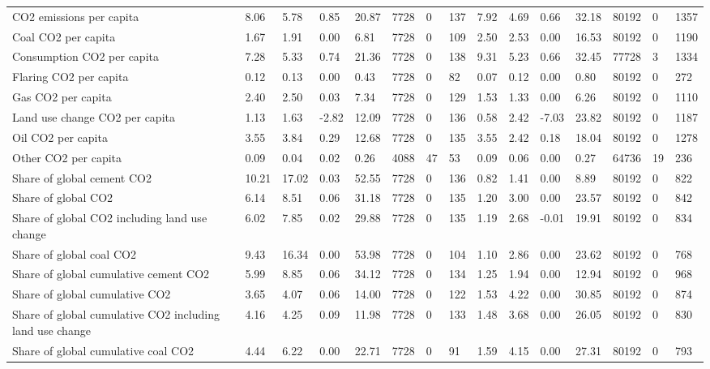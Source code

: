 \begin{longtable}{lllllllllllllll}
CO2 emissions per capita & 8.06 & 5.78 & 0.85 & 20.87 & 7728 & 0 & 137 & 7.92 & 4.69 & 0.66 & 32.18 & 80192 & 0 & 1357\\
Coal CO2 per capita & 1.67 & 1.91 & 0.00 & 6.81 & 7728 & 0 & 109 & 2.50 & 2.53 & 0.00 & 16.53 & 80192 & 0 & 1190\\
Consumption CO2 per capita & 7.28 & 5.33 & 0.74 & 21.36 & 7728 & 0 & 138 & 9.31 & 5.23 & 0.66 & 32.45 & 77728 & 3 & 1334\\
\addlinespace
Flaring CO2 per capita & 0.12 & 0.13 & 0.00 & 0.43 & 7728 & 0 & 82 & 0.07 & 0.12 & 0.00 & 0.80 & 80192 & 0 & 272\\
Gas CO2 per capita & 2.40 & 2.50 & 0.03 & 7.34 & 7728 & 0 & 129 & 1.53 & 1.33 & 0.00 & 6.26 & 80192 & 0 & 1110\\
Land use change CO2 per capita & 1.13 & 1.63 & -2.82 & 12.09 & 7728 & 0 & 136 & 0.58 & 2.42 & -7.03 & 23.82 & 80192 & 0 & 1187\\
Oil CO2 per capita & 3.55 & 3.84 & 0.29 & 12.68 & 7728 & 0 & 135 & 3.55 & 2.42 & 0.18 & 18.04 & 80192 & 0 & 1278\\
Other CO2 per capita & 0.09 & 0.04 & 0.02 & 0.26 & 4088 & 47 & 53 & 0.09 & 0.06 & 0.00 & 0.27 & 64736 & 19 & 236\\
\addlinespace
Share of global cement CO2 & 10.21 & 17.02 & 0.03 & 52.55 & 7728 & 0 & 136 & 0.82 & 1.41 & 0.00 & 8.89 & 80192 & 0 & 822\\
Share of global CO2 & 6.14 & 8.51 & 0.06 & 31.18 & 7728 & 0 & 135 & 1.20 & 3.00 & 0.00 & 23.57 & 80192 & 0 & 842\\
Share of global CO2 including land use change & 6.02 & 7.85 & 0.02 & 29.88 & 7728 & 0 & 135 & 1.19 & 2.68 & -0.01 & 19.91 & 80192 & 0 & 834\\
Share of global coal CO2 & 9.43 & 16.34 & 0.00 & 53.98 & 7728 & 0 & 104 & 1.10 & 2.86 & 0.00 & 23.62 & 80192 & 0 & 768\\
Share of global cumulative cement CO2 & 5.99 & 8.85 & 0.06 & 34.12 & 7728 & 0 & 134 & 1.25 & 1.94 & 0.00 & 12.94 & 80192 & 0 & 968\\
\addlinespace
Share of global cumulative CO2 & 3.65 & 4.07 & 0.06 & 14.00 & 7728 & 0 & 122 & 1.53 & 4.22 & 0.00 & 30.85 & 80192 & 0 & 874\\
Share of global cumulative CO2 including land use change & 4.16 & 4.25 & 0.09 & 11.98 & 7728 & 0 & 133 & 1.48 & 3.68 & 0.00 & 26.05 & 80192 & 0 & 830\\
Share of global cumulative coal CO2 & 4.44 & 6.22 & 0.00 & 22.71 & 7728 & 0 & 91 & 1.59 & 4.15 & 0.00 & 27.31 & 80192 & 0 & 793\\

\end{longtable}
